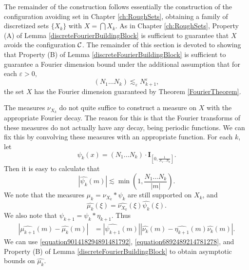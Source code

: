 \begin{comment}
    Combining \eqref{fourierdim1}, \eqref{fourierdim2}, and \eqref{fourierdim3}, we conclude that there exists a constant $C$ such that with probability at least
    \[ 1 - 2 \exp \left( \frac{-N^{d-s/n}}{A^{1/n} (\log N)^{1/n}} \right) - 1/\log N - \frac{2^{d+1}}{N^{c \log N - d}} \geq 1 - C / \log N, \]
    the set $X$ avoids $K$, and for all $m \in \{ -N, \dots, N \}^d$,
    \[ |\widehat{f}(m)| \leq \frac{C (\log N)^{1-1/n}}{N^{d-s/n}}. \qedhere \]
\end{proof}
\end{comment}

The remainder of the construction follows essentially the construction of the configuration avoiding set in Chapter \ref{ch:RoughSets}, obtaining a family of discretized sets $\{ X_k \}$ with $X = \bigcap X_k$. As in Chapter \ref{ch:RoughSets}, Property (A) of Lemma \eqref{discreteFourierBuildingBlock} is sufficient to guarantee that $X$ avoids the configuration $\operatorname{\mathcal{C}}$. The remainder of this section is devoted to showing that Property (B) of Lemma \eqref{discreteFourierBuildingBlock} is sufficient to guarantee a Fourier dimension bound under the additional assumption that for each $\varepsilon > 0$,
%
\begin{equation} \label{equation41028694692} (N_1 \dots N_k) \lesssim_\varepsilon N_{k+1}^\varepsilon, \end{equation}
%
the set $X$ has the Fourier dimension guaranteed by Theorem \ref{FourierTheorem}.

The measures $\nu_{X_k}$ do not quite suffice to construct a measure on $X$ with the appropriate Fourier decay. The reason for this is that the Fourier transforms of these measures do not actually have any decay, being periodic functions. We can fix this by convolving these measures with an appropriate function. For each $k$, let
%
\[ \psi_k(x) = (N_1 \dots N_k) \cdot \mathbf{I}_{\left[ 0, \frac{1}{N_1 \dots N_k} \right]}. \]
%
Then it is easy to calculate that
%
\begin{equation} \label{equation901418294891481792}
    |\widehat{\psi_k}(m)| \lesssim \min \left( 1, \frac{N_1 \dots N_k}{|m|} \right).
\end{equation}
%
We note that the measures $\mu_k = \nu_{X_k} * \psi_k$ are still supported on $X_k$, and
%
\[ \widehat{\mu_k}(\xi) = \widehat{\nu_{X_k}}(\xi) \widehat{\psi_k}(\xi). \]
%
We also note that $\psi_{k+1} = \psi_k * \eta_{k+1}$. Thus
%
\begin{equation} \label{equation6892489214781278}
\begin{split}
    |\widehat{\mu_{k+1}}(m) - \widehat{\mu_k}(m)| &= |\widehat{\psi_{k+1}}(m)| |\widehat{\nu_k}(m) - \widehat{\eta_{k+1}}(m) \widehat{\nu_k}(m)|.
\end{split}
\end{equation}
%
We can use \eqref{equation901418294891481792}, \eqref{equation6892489214781278}, and Property (B) of Lemma \ref{discreteFourierBuildingBlock} to obtain asymptotic bounds on $\widehat{\mu_k}$.

